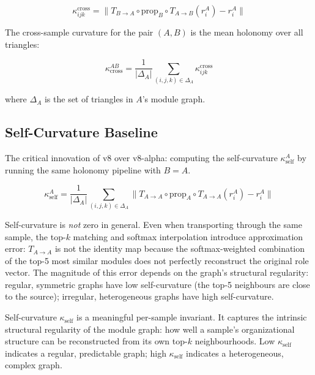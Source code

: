 \documentclass{../yalumba}
\begin{document}
\begin{equation}
  \kappa_{ijk}^{\text{cross}} = \|T_{B \to A} \circ
    \text{prop}_B \circ T_{A \to B}(r_i^A) - r_i^A\|
  \label{eq:cross-holonomy}
\end{equation}

The cross-sample curvature for the pair $(A, B)$ is the mean holonomy
over all triangles:

\begin{equation}
  \kappa_{\text{cross}}^{AB} = \frac{1}{|\Delta_A|}
    \sum_{(i,j,k) \in \Delta_A} \kappa_{ijk}^{\text{cross}}
  \label{eq:mean-cross}
\end{equation}

where $\Delta_A$ is the set of triangles in $A$'s module graph.

\subsection{Self-Curvature Baseline}
\label{sec:self-baseline}

The critical innovation of v8 over v8-alpha: computing the self-curvature
$\kappa_{\text{self}}^A$ by running the same holonomy pipeline with
$B = A$.

\begin{equation}
  \kappa_{\text{self}}^A = \frac{1}{|\Delta_A|}
    \sum_{(i,j,k) \in \Delta_A}
    \|T_{A \to A} \circ \text{prop}_A \circ T_{A \to A}(r_i^A) - r_i^A\|
  \label{eq:self-holonomy}
\end{equation}

Self-curvature is \emph{not} zero in general.  Even when transporting
through the same sample, the top-$k$ matching and softmax interpolation
introduce approximation error: $T_{A \to A}$ is not the identity map
because the softmax-weighted combination of the top-5 most similar modules
does not perfectly reconstruct the original role vector.  The magnitude
of this error depends on the graph's structural regularity: regular,
symmetric graphs have low self-curvature (the top-5 neighbours are close
to the source); irregular, heterogeneous graphs have high self-curvature.

\begin{keyfinding}
Self-curvature $\kappa_{\text{self}}$ is a meaningful per-sample invariant.
It captures the intrinsic structural regularity of the module graph: how
well a sample's organizational structure can be reconstructed from its own
top-$k$ neighbourhoods.  Low $\kappa_{\text{self}}$ indicates a regular,
predictable graph; high $\kappa_{\text{self}}$ indicates a heterogeneous,
complex graph.
\end{keyfinding}
\end{document}
